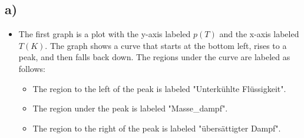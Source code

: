 

\subsection*{a)}

\begin{itemize}
    \item The first graph is a plot with the y-axis labeled \( p(T) \) and the x-axis labeled \( T(K) \). The graph shows a curve that starts at the bottom left, rises to a peak, and then falls back down. The regions under the curve are labeled as follows:
        \begin{itemize}
            \item The region to the left of the peak is labeled "Unterkühlte Flüssigkeit".
            \item The region under the peak is labeled "Masse\_dampf".
            \item The region to the right of the peak is labeled "übersättigter Dampf".
        \end{itemize}
\end{itemize}